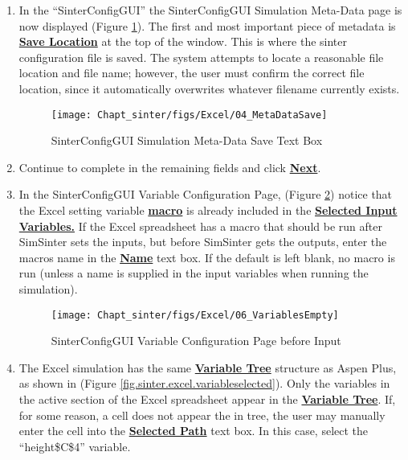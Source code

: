 \begin{enumerate}
\item	In the ``SinterConfigGUI'' the SinterConfigGUI Simulation Meta-Data page is now displayed (Figure \ref{fig.sinter.excel.savename}). The
  first and most important piece of metadata is \textbf{\underline{Save Location}} at
  the top of the window.  This is where the sinter configuration file is saved. 
  The system attempts to locate a reasonable file location and file name; however, the user must confirm the correct file location, since it automatically overwrites whatever filename currently exists.
\begin{figure}[H]
	\begin{center}
		\texttt{[image: Chapt\_sinter/figs/Excel/04\_MetaDataSave]}
		\caption{SinterConfigGUI Simulation Meta-Data Save Text Box}
		\label{fig.sinter.excel.savename}
	\end{center}
\end{figure}

\item Continue to complete in the remaining fields and click \textbf{\underline{Next}}. 

\item In the SinterConfigGUI Variable
      Configuration Page, (Figure
  \ref{fig.sinter.excel.variableempty}) notice that the Excel setting
  variable \textbf{\underline{macro}} is already included in the
  \textbf{\underline{Selected Input Variables.}}  If the Excel spreadsheet has a macro that should be run after SimSinter sets the inputs, but before SimSinter gets the outputs, enter the macros name in the \textbf{\underline{Name}} text box.  If the default is left blank, no macro is run (unless a name is supplied in the input variables when running the simulation).
\begin{figure}[H]
	\begin{center}
		\texttt{[image: Chapt\_sinter/figs/Excel/06\_VariablesEmpty]}
		\caption{SinterConfigGUI Variable Configuration Page before Input}
		\label{fig.sinter.excel.variableempty}
	\end{center}
\end{figure}

\item The Excel simulation has the same \textbf{\underline{Variable
      Tree}} structure as Aspen Plus, as shown in (Figure
  \ref{fig.sinter.excel.variableselected}).  Only the variables in the
  active section of the Excel spreadsheet appear
  in the \textbf{\underline{Variable Tree}}.  If, for some reason, a cell does not appear
  the in tree, the user may manually enter the cell into the \textbf{\underline{Selected Path}} text box.  In this case, select the ``height\$C\$4'' variable.


\end{enumerate}
